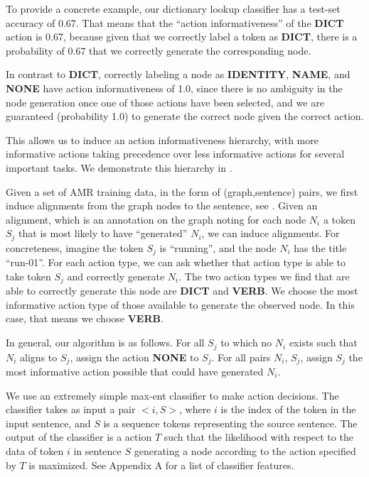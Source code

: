 \documentclass[11pt]{article}
\begin{document}
To provide a concrete example, our dictionary lookup classifier has a test-set accuracy of 0.67. That means that the ``action informativeness'' of the \textbf{DICT} action is 0.67, because given that we correctly label a token as \textbf{DICT}, there is a probability of 0.67 that we correctly generate the corresponding node.

In contrast to \textbf{DICT}, correctly labeling a node as \textbf{IDENTITY}, \textbf{NAME}, and \textbf{NONE} have action informativeness of 1.0, since there is no ambiguity in the node generation once one of those actions have been selected, and we are guaranteed (probability 1.0) to generate the correct node given the correct action.


This allows us to induce an action informativeness hierarchy, with more informative actions taking precedence over less informative actions for several important tasks. We demonstrate this hierarchy in .


Given a set of AMR training data, in the form of (graph,sentence) pairs, we first induce alignments from the graph nodes to the sentence, see . Given an alignment, which is an annotation on the graph noting for each node $N_i$ a token $S_j$ that is most likely to have ``generated'' $N_i$, we can induce alignments. For concreteness, imagine the token $S_j$ is ``running'', and the node $N_i$ has the title ``run-01''. For each action type, we can ask whether that action type is able to take token $S_j$ and correctly generate $N_i$. The two action types we find that are able to correctly generate this node are \textbf{DICT} and \textbf{VERB}. We choose the most informative action type of those available to generate the observed node. In this case, that means we choose \textbf{VERB}.

In general, our algorithm is as follows. For all $S_j$ to which no $N_i$ exists such that $N_i$ aligns to $S_j$, assign the action \textbf{NONE} to $S_j$. For all pairs $N_i$, $S_j$, assign $S_j$ the most informative action possible that could have generated $N_i$. 


We use an extremely simple max-ent classifier to make action decisions. The classifier takes as input a pair $< i, S >$, where $i$ is the index of the token in the input sentence, and $S$ is a sequence tokens representing the source sentence. The output of the classifier is a action $T$ such that the likelihood with respect to the data of token $i$ in sentence $S$ generating a node according to the action specified by $T$ is maximized. See Appendix A for a list of classifier features.
\end{document}
